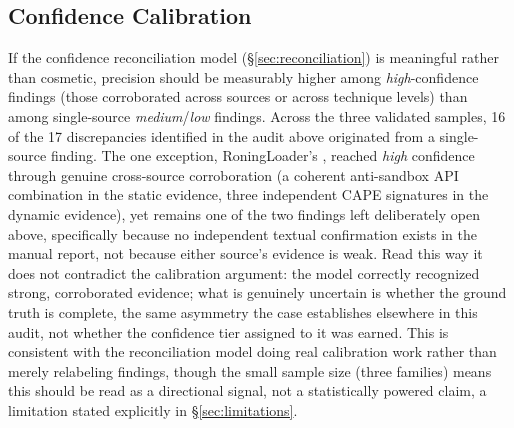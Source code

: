 \subsection{Confidence Calibration}
\label{sec:confidence-calibration}

If the confidence reconciliation model (\S\ref{sec:reconciliation}) is
meaningful rather than cosmetic, precision should be measurably higher
among \emph{high}-confidence findings (those corroborated across
sources or across technique levels) than among single-source
\emph{medium}/\emph{low} findings. Across the three validated samples,
16 of the 17 discrepancies identified in the audit above originated
from a single-source finding. The one exception, RoningLoader's
, reached \emph{high} confidence through genuine
cross-source corroboration (a coherent anti-sandbox API combination in
the static evidence, three independent CAPE signatures in the dynamic
evidence), yet remains one of the two findings left deliberately open
above, specifically because no independent textual confirmation exists
in the manual report, not because either source's evidence is weak.
Read this way it does not contradict the calibration argument: the
model correctly recognized strong, corroborated evidence; what is
genuinely uncertain is whether the ground truth is complete, the same
asymmetry the  case establishes elsewhere in this
audit, not whether the confidence tier assigned to it was earned. This
is consistent with the reconciliation model doing real calibration work
rather than merely relabeling findings, though the small sample size
(three families) means this should be read as a directional signal, not
a statistically powered claim, a limitation stated explicitly in
\S\ref{sec:limitations}.
